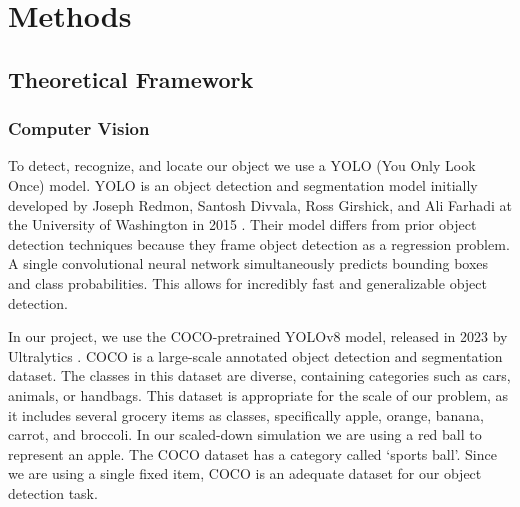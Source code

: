 \documentclass{article}
\begin{document}
\section{Methods}





\subsection{Theoretical Framework}

\subsubsection{Computer Vision}

To detect, recognize, and locate our object we use a YOLO (You Only Look Once) model. YOLO is an object detection and segmentation model initially developed by Joseph Redmon, Santosh Divvala, Ross Girshick, and Ali Farhadi at the University of Washington in 2015 \cite{DBLP:journals/corr/RedmonDGF15}. Their model differs from prior object detection techniques because they frame object detection as a regression problem. A single convolutional neural network simultaneously predicts bounding boxes and class probabilities. This allows for incredibly fast and generalizable object detection.


In our project, we use the COCO-pretrained YOLOv8 model, released in 2023 by Ultralytics \cite{yolov8_ultralytics}. COCO is a large-scale annotated object detection and segmentation dataset. The classes in this dataset are diverse, containing categories such as cars, animals, or handbags. This dataset is appropriate for the scale of our problem, as it includes several grocery items as classes, specifically apple, orange, banana, carrot, and broccoli. In our scaled-down simulation we are using a red ball to represent an apple. The COCO dataset has a category called `sports ball'. Since we are using a single fixed item, COCO is an adequate dataset for our object detection task.
\end{document}
